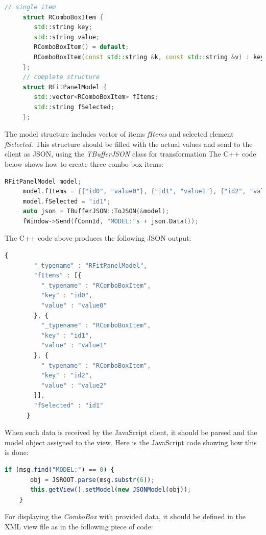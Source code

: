 \documentclass[a4paper]{jpconf}
\begin{document}
\begin{lstlisting}[language=C++,numbers=none]
     // single item
     struct RComboBoxItem {
        std::string key;
        std::string value;
        RComboBoxItem() = default;
        RComboBoxItem(const std::string &k, const std::string &v) : key(k), value(v) {}
     };
     // complete structure
     struct RFitPanelModel {
        std::vector<RComboBoxItem> fItems;
        std::string fSelected;
     };
\end{lstlisting}

The model structure includes vector of items \textit{fItems} and selected element \textit{fSelected}.
This structure should be filled with the actual values and send to the client as JSON, using the \textit{TBufferJSON} class for transformation The C++ code below shows how to create three combo box items:

\begin{lstlisting}[language=C++,numbers=none]
     RFitPanelModel model;
     model.fItems = {{"id0", "value0"}, {"id1", "value1"}, {"id2", "value2"}};
     model.fSelected = "id1";
     auto json = TBufferJSON::ToJSON(&model);
     fWindow->Send(fConnId, "MODEL:"s + json.Data());
\end{lstlisting}

The C++ code above produces the following JSON output:

\begin{lstlisting}[language=JavaScript,numbers=none]
      {
        "_typename" : "RFitPanelModel",
        "fItems" : [{
          "_typename" : "RComboBoxItem",
          "key" : "id0",
          "value" : "value0"
        }, {
          "_typename" : "RComboBoxItem",
          "key" : "id1",
          "value" : "value1"
        }, {
          "_typename" : "RComboBoxItem",
          "key" : "id2",
          "value" : "value2"
        }],
        "fSelected" : "id1"
      }
\end{lstlisting}

When such data is received by the JavaScript client, it should be parsed and the model object assigned to the view.
Here is the JavaScript code showing how this is done:

\begin{lstlisting}[language=JavaScript,numbers=none]
    if (msg.find("MODEL:") == 0) {
       obj = JSROOT.parse(msg.substr(6));
       this.getView().setModel(new JSONModel(obj));
    }
\end{lstlisting}

For displaying the \textit{ComboBox} with provided data, it should be defined in the XML view file as in the following piece of code:
\end{document}
